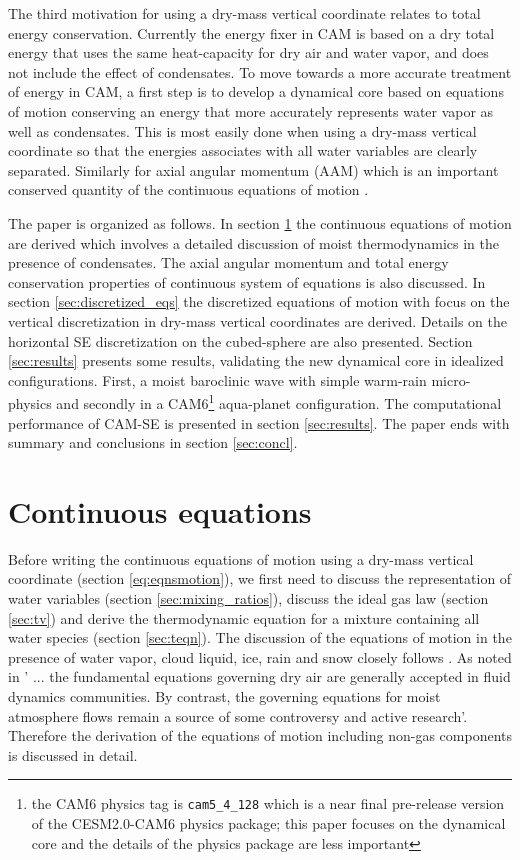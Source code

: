 \documentclass{agujournal}
\begin{document}
{The third motivation for using a dry-mass vertical coordinate relates to total energy conservation. Currently the energy fixer in CAM is based on a dry total energy \citep{WOHTTV2015JAMES} that uses the same heat-capacity for dry air and water vapor, and does not include the effect of condensates. To move towards a more accurate treatment of energy in CAM, a first step is to develop a dynamical core based on equations of motion conserving an energy that more accurately represents water vapor as well as condensates. This is most easily done when using a dry-mass vertical coordinate so that the energies associates with all water variables are clearly separated. Similarly for axial angular momentum (AAM) which is an important conserved quantity of the continuous equations of motion \citep[e.g., ][]{LHECFF2010JGR}.

The paper is organized as follows. In section \ref{sec:cont-eq} the continuous equations of motion are derived which involves a detailed discussion of moist thermodynamics in the presence of condensates. The axial angular momentum and total energy conservation properties of continuous system of equations is also discussed. In section \ref{sec:discretized_eqs} the discretized equations of motion with focus on the vertical discretization in dry-mass vertical coordinates are derived. Details on the horizontal SE discretization on the cubed-sphere are also presented. Section \ref{sec:results} presents some results, validating the new dynamical core in idealized configurations. First, a moist baroclinic wave with simple warm-rain micro-physics and secondly in a CAM6{\footnote{the CAM6 physics tag is {\tt{cam5\_4\_128}} which is a near final pre-release version of the CESM2.0-CAM6 physics package; this paper focuses on the dynamical core and the details of the physics package are less important}} aqua-planet configuration. The computational performance of CAM-SE is presented in section \ref{sec:results}. The paper ends with summary and conclusions in section \ref{sec:concl}.
%
\section{Continuous equations}\label{sec:cont-eq}
Before writing the continuous equations of motion using a dry-mass vertical coordinate (section \ref{eq:eqnsmotion}), we first need to discuss the representation of water variables (section \ref{sec:mixing_ratios}), discuss the ideal gas law (section \ref{sec:tv}) and derive the thermodynamic equation for a mixture containing all water species (section \ref{sec:teqn}). The discussion of the equations of motion in the presence of water vapor, cloud liquid, ice, rain and snow closely follows \citet{joyOfUM}. As noted in \cite{cotton2010storm} ' ... the fundamental equations governing dry air are generally accepted in fluid dynamics communities. By contrast, the governing equations for moist atmosphere flows remain a source of some controversy and active research'. Therefore the derivation of the equations of motion including non-gas components is discussed in detail.

}
\end{document}
